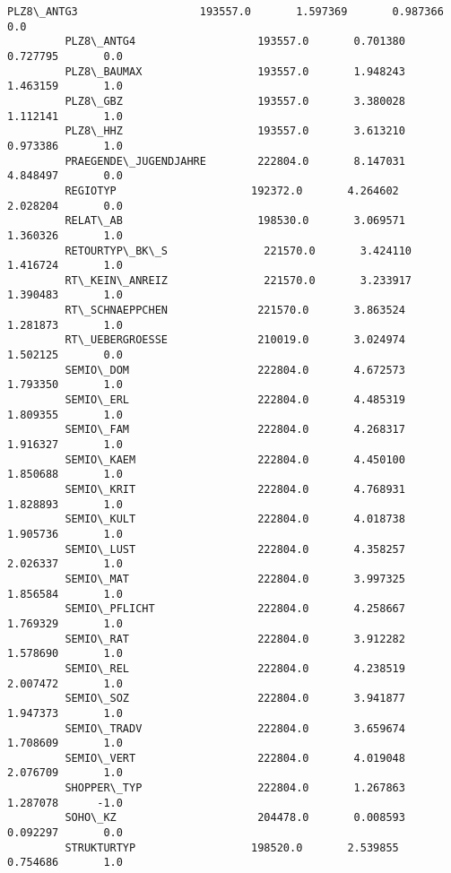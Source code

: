 \documentclass[11pt]{article}
\begin{document}
\begin{Verbatim}[commandchars=\\\{\}]
         PLZ8\_ANTG3                   193557.0       1.597369       0.987366       0.0   
         PLZ8\_ANTG4                   193557.0       0.701380       0.727795       0.0   
         PLZ8\_BAUMAX                  193557.0       1.948243       1.463159       1.0   
         PLZ8\_GBZ                     193557.0       3.380028       1.112141       1.0   
         PLZ8\_HHZ                     193557.0       3.613210       0.973386       1.0   
         PRAEGENDE\_JUGENDJAHRE        222804.0       8.147031       4.848497       0.0   
         REGIOTYP                     192372.0       4.264602       2.028204       0.0   
         RELAT\_AB                     198530.0       3.069571       1.360326       1.0   
         RETOURTYP\_BK\_S               221570.0       3.424110       1.416724       1.0   
         RT\_KEIN\_ANREIZ               221570.0       3.233917       1.390483       1.0   
         RT\_SCHNAEPPCHEN              221570.0       3.863524       1.281873       1.0   
         RT\_UEBERGROESSE              210019.0       3.024974       1.502125       0.0   
         SEMIO\_DOM                    222804.0       4.672573       1.793350       1.0   
         SEMIO\_ERL                    222804.0       4.485319       1.809355       1.0   
         SEMIO\_FAM                    222804.0       4.268317       1.916327       1.0   
         SEMIO\_KAEM                   222804.0       4.450100       1.850688       1.0   
         SEMIO\_KRIT                   222804.0       4.768931       1.828893       1.0   
         SEMIO\_KULT                   222804.0       4.018738       1.905736       1.0   
         SEMIO\_LUST                   222804.0       4.358257       2.026337       1.0   
         SEMIO\_MAT                    222804.0       3.997325       1.856584       1.0   
         SEMIO\_PFLICHT                222804.0       4.258667       1.769329       1.0   
         SEMIO\_RAT                    222804.0       3.912282       1.578690       1.0   
         SEMIO\_REL                    222804.0       4.238519       2.007472       1.0   
         SEMIO\_SOZ                    222804.0       3.941877       1.947373       1.0   
         SEMIO\_TRADV                  222804.0       3.659674       1.708609       1.0   
         SEMIO\_VERT                   222804.0       4.019048       2.076709       1.0   
         SHOPPER\_TYP                  222804.0       1.267863       1.287078      -1.0   
         SOHO\_KZ                      204478.0       0.008593       0.092297       0.0   
         STRUKTURTYP                  198520.0       2.539855       0.754686       1.0   

\end{Verbatim}
\end{document}
